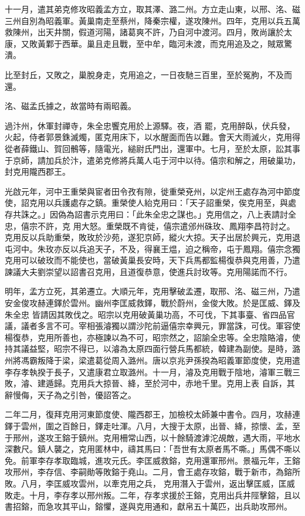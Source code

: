 \begin{pinyinscope}
 十一月，遣其弟克修攻昭義孟方立，取其澤、潞二州。方立走山東，以邢、洺、磁三州自別為昭義軍。黃巢南走至蔡州，降秦宗權，遂攻陳州。四年，克用以兵五萬救陳州，出天井關，假道河陽，諸葛爽不許，乃自河中渡河。四月，敗尚讓於太康，又敗黃鄴于西華。巢且走且戰，至中牟，臨河未渡，而克用追及之，賊眾驚潰。



 比至封丘，又敗之，巢脫身走，克用追之，一日夜馳三百里，至於冤朐，不及而還。



 洺、磁孟氏據之，故當時有兩昭義。



 過汴州，休軍封禪寺，朱全忠饗克用於上源驛。夜，酒
 罷，克用醉臥，伏兵發，火起，侍者郭景銖滅燭，匿克用床下，以水醒面而告以難。會天大雨滅火，克用得從者薛鐵山、賀回鶻等，隨電光，縋尉氏門出，還軍中。七月，至於太原，訟其事于京師，請加兵於汴，遣弟克修將兵萬人屯于河中以待。僖宗和解之，用破巢功，封克用隴西郡王。



 光啟元年，河中王重榮與宦者田令孜有隙，徙重榮兗州，以定州王處存為河中節度使，詔克用以兵護處存之鎮。重榮使人紿克用曰：「天子詔重榮，俟克用至，與處存共誅之。」因偽為詔書示克用曰：「此朱全忠之謀也。」克用信之，八上表請討全忠，僖宗不許，克
 用大怒。重榮既不肯徙，僖宗遣邠州硃玫、鳳翔李昌符討之。克用反以兵助重榮，敗玫於沙苑，遂犯京師，縱火大掠。天子出居於興元，克用退屯河中。朱玫亦反以兵追天子，不及，得襄王煴，迫之稱帝，屯于鳳翔。僖宗念獨克用可以破玫而不能使也，當破黃巢長安時，天下兵馬都監楊復恭與克用善，乃遣諫議大夫劉崇望以詔書召克用，且道復恭意，使進兵討玫等。克用陽諾而不行。



 明年，孟方立死，其弟遷立。大順元年，克用擊破孟遷，取邢、洺、磁三州，乃遣安金俊攻赫連鐸於雲州。幽州李匡威救鐸，戰於蔚州，金俊大敗。於是匡威、鐸及朱全忠
 皆請因其敗伐之。昭宗以克用破黃巢功高，不可伐，下其事臺、省四品官議，議者多言不可。宰相張濬獨以謂沙陀前逼僖宗幸興元，罪當誅，可伐。軍容使楊復恭，克用所善也，亦極諫以為不可，昭宗然之，詔諭全忠等。全忠陰賂濬，使持其議益堅，昭宗不得已，以濬為太原四面行營兵馬都統，韓建為副使。是時，潞州將馮霸叛降于梁，梁遣葛從周入潞州。唐以京兆尹孫揆為昭義軍節度使，克用遣李存孝執揆于長子，又遣康君立取潞州。十一月，濬及克用戰于陰地，濬軍三戰三敗，濬、建遁歸。克用兵大掠晉、絳，至於河中，赤地千里。克用上表
 自訴，其辭慢侮，天子為之引咎，優詔答之。



 二年二月，復拜克用河東節度使、隴西郡王，加檢校太師兼中書令。四月，攻赫連鐸于雲州，圍之百餘日，鐸走吐渾。八月，大搜于太原，出晉、絳，掠懷、孟，至于邢州，遂攻王鎔于鎮州。克用柵常山西，以十餘騎渡滹沱覘敵，遇大雨，平地水深數尺。鎮人襲之，克用匿林中，禱其馬曰：「吾世有太原者馬不嘶。」馬偶不嘶以免。前軍李存孝取臨城，進攻元氏。李匡威救鎔，克用還軍邢州。景福元年，王鎔攻邢州，李存信、李嗣勛等敗鎔于堯山。二月，會王處存攻鎔，戰于新市，為鎔所敗。八月，李匡威攻雲州，以牽克用之兵，
 克用潛入于雲州，返出擊匡威，匡威敗走。十月，李存孝以邢州叛。二年，存孝求援於王鎔，克用出兵井陘擊鎔，且以書招鎔，而急攻其平山，鎔懼，遂與克用通和，獻帛五十萬匹，出兵助攻邢州。




\end{pinyinscope}
